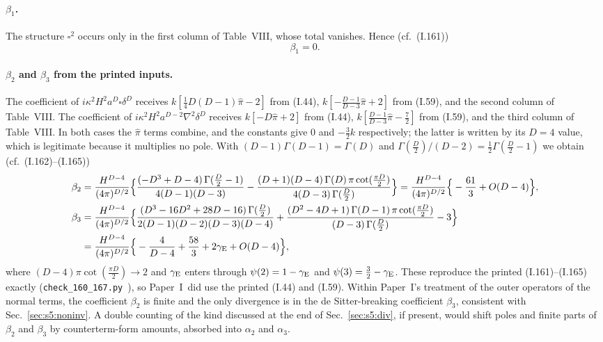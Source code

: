 \documentclass[aps,prd,onecolumn,10pt,nofootinbib,floatfix]{revtex4-2}
\newcommand{\PI}{Paper~I}
\newcommand{\eqI}[1]{(I.#1)}
\newcommand{\pihat}{\hat\pi}
\begin{document}
\paragraph*{$\beta_1$.}
The structure $\square^2$ occurs only in the first column of Table~VIII, whose total vanishes. Hence (cf.\ \eqI{161})
\begin{equation}
\beta_1=0 .
\label{eq:s5:161}
\end{equation}

\paragraph*{$\beta_2$ and $\beta_3$ from the printed inputs.}
The coefficient of $i\kappa^2H^2a^D\square\delta^D$ receives $k[\frac14D(D-1)\pihat-2]$ from \eqI{44}, $k[-\frac{D-1}{D-3}\pihat+2]$ from \eqI{59}, and the second column of Table~VIII.
The coefficient of $i\kappa^2H^2a^{D-2}\nabla^2\delta^D$ receives $k[-D\pihat+2]$ from \eqI{44}, $k[\frac{D-1}{D-3}\pihat-\frac72]$ from \eqI{59}, and the third column of Table~VIII.
In both cases the $\pihat$ terms combine, and the constants give $0$ and $-\frac32k$ respectively; the latter is written by its $D=4$ value, which is legitimate because it multiplies no pole.
With $(D-1)\Gamma(D-1)=\Gamma(D)$ and $\Gamma(\frac D2)/(D-2)=\frac12\Gamma(\frac D2-1)$ we obtain (cf.\ \eqI{162}--\eqI{165})
\begin{align}
\beta_2&=\frac{H^{D-4}}{(4\pi)^{D/2}}\Big\{\frac{(-D^3+D-4)\,\Gamma(\frac D2-1)}{4(D-1)(D-3)}-\frac{(D+1)(D-4)\,\Gamma(D)\,\pi\cot(\frac{\pi D}2)}{4(D-3)\,\Gamma(\frac D2)}\Big\}
=\frac{H^{D-4}}{(4\pi)^{D/2}}\Big\{-\frac{61}{3}+O(D-4)\Big\},
\label{eq:s5:162}\\
\beta_3&=\frac{H^{D-4}}{(4\pi)^{D/2}}\Big\{\frac{(D^3-16D^2+28D-16)\,\Gamma(\frac D2)}{2(D-1)(D-2)(D-3)(D-4)}+\frac{(D^2-4D+1)\,\Gamma(D-1)\,\pi\cot(\frac{\pi D}2)}{(D-3)\,\Gamma(\frac D2)}-3\Big\}
\notag\\
&=\frac{H^{D-4}}{(4\pi)^{D/2}}\Big\{-\frac{4}{D-4}+\frac{58}{3}+2\gamma_{\rm E}+O(D-4)\Big\},
\label{eq:s5:164}
\end{align}
where $(D-4)\pi\cot(\frac{\pi D}{2})\to2$ and $\gamma_{\rm E}$ enters through $\psi(2)=1-\gamma_{\rm E}$ and $\psi(3)=\frac32-\gamma_{\rm E}$.
These reproduce the printed \eqI{161}--\eqI{165} exactly (\texttt{check\_160\_167.py}~\cite{ref:repo}), so \PI\ did use the printed \eqI{44} and \eqI{59}.
Within \PI's treatment of the outer operators of the normal terms, the coefficient $\beta_2$ is finite and the only divergence is in the de Sitter-breaking coefficient $\beta_3$, consistent with Sec.~\ref{sec:s5:noninv}.
A double counting of the kind discussed at the end of Sec.~\ref{sec:s5:div}, if present, would shift poles and finite parts of $\beta_2$ and $\beta_3$ by counterterm-form amounts, absorbed into $\alpha_2$ and $\alpha_3$.
\end{document}
